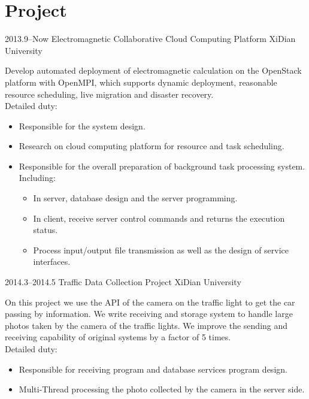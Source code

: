 \documentclass[]{friggeri-cv} %
\begin{document}

\section{Project}

\begin{entrylist}
\entry
{2013.9--Now}
{Electromagnetic Collaborative Cloud Computing Platform}
{XiDian University}
{Develop automated deployment of electromagnetic calculation on the OpenStack platform with OpenMPI, which supports dynamic deployment, reasonable resource scheduling, live migration and disaster recovery.\\
Detailed duty:
\begin{itemize}
\item Responsible for the system design.
\item Research on cloud computing platform for resource and task scheduling.
\item Responsible for the overall preparation of background task processing system.\\Including:
  \begin{itemize}
    \item In server, database design and the server programming.
    \item In client, receive server control commands and returns the execution status.
    \item Process input/output file transmission as well as the design of service interfaces.
  \end{itemize}
\end{itemize}}
\entry
{2014.3--2014.5}
{Traffic Data Collection Project}
{XiDian University}
{On this project we use the API of the camera on the traffic light to get the car passing by information. 
We write receiving and storage system to handle large photos taken by the camera of the traffic lights. We improve the sending and receiving capability of original systems by a factor of 5 times.\\
Detailed duty:
\begin{itemize}
  \item Responsible for receiving program and database services program design.
  \item Multi-Thread processing the photo collected by the camera in the server side.

\end{itemize}}
\end{entrylist}
\end{document}
